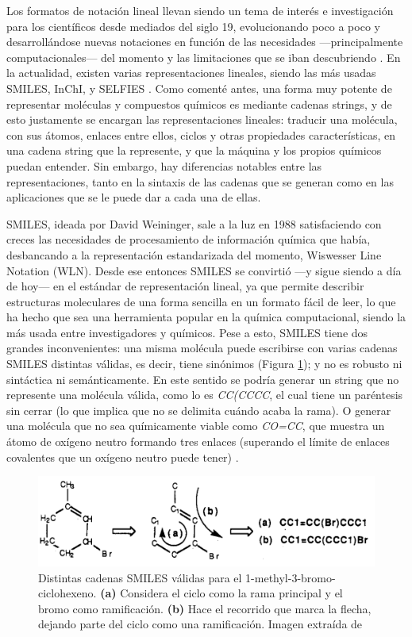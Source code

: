 Los formatos de notación lineal llevan siendo un tema de interés e investigación para los científicos desde mediados del siglo 19, evolucionando poco a poco y desarrollándose nuevas notaciones en función de las necesidades —principalmente computacionales— del momento y las limitaciones que se iban descubriendo \cite{107_years_linear_notations}. En la actualidad, existen varias representaciones lineales, siendo las más usadas SMILES, InChI, y SELFIES \cite{SELFIES}. Como comenté antes, una forma muy potente de representar moléculas y compuestos químicos es mediante cadenas strings, y de esto justamente se encargan las representaciones lineales: traducir una molécula, con sus átomos, enlaces entre ellos, ciclos y otras propiedades características, en una cadena string que la represente, y que la máquina y los propios químicos puedan entender. Sin embargo, hay diferencias notables entre las representaciones, tanto en la sintaxis de las cadenas que se generan como en las aplicaciones que se le puede dar a cada una de ellas.


SMILES, ideada por David Weininger, sale a la luz en 1988 satisfaciendo con creces las necesidades de procesamiento de información química que había, desbancando a la representación estandarizada del momento, Wiswesser Line Notation (WLN). Desde ese entonces SMILES se convirtió —y sigue siendo a día de hoy— en el estándar de representación lineal, ya que permite describir estructuras moleculares de una forma sencilla en un formato fácil de leer, lo que ha hecho que sea una herramienta popular en la química computacional, siendo la más usada entre investigadores y químicos. Pese a esto, SMILES tiene dos grandes inconvenientes: una misma molécula puede escribirse con varias cadenas SMILES distintas válidas, es decir, tiene sinónimos (Figura \ref{fig:sinonimos_smiles}); y no es robusto ni sintáctica ni semánticamente. En este sentido se podría generar un string que no represente una molécula válida, como lo es \emph{CC(CCCC}, el cual tiene un paréntesis sin cerrar (lo que implica que no se delimita cuándo acaba la rama). O generar una molécula que no sea químicamente viable como \emph{CO=CC}, que muestra un átomo de oxígeno neutro formando tres enlaces (superando el límite de enlaces covalentes que un oxígeno neutro puede tener) \cite{SELFIES}.

\begin{figure}[H]
\centering
    \includegraphics[scale=0.4]{imagenes/intro/sinonimos.png}
    \caption{Distintas cadenas SMILES válidas para el 1-methyl-3-bromo-ciclohexeno. \textbf{(a)} Considera el ciclo como la rama principal y el bromo como ramificación. \textbf{(b)} Hace el recorrido que marca la flecha, dejando parte del ciclo como una ramificación. Imagen extraída de \cite{weininger_smiles_1988}}
    \label{fig:sinonimos_smiles}
\end{figure}

